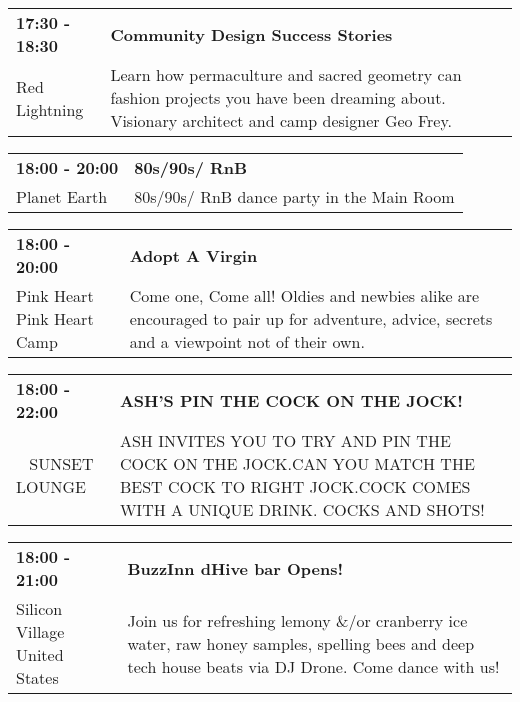\begin{tabular}{ p{1in} p{2.2in} }
    \textbf{17:30 - 18:30} & \textbf{Community Design Success Stories} \\
    Red Lightning \newline  & Learn how permaculture and sacred geometry can fashion projects you have been dreaming about. Visionary architect and camp designer Geo Frey. \\
    \hline 
\end{tabular}
    
\begin{tabular}{ p{1in} p{2.2in} }
    \textbf{18:00 - 20:00} & \textbf{80s/90s/ RnB} \\
    Planet Earth \newline  & 80s/90s/ RnB dance party in the Main Room \\
    \hline 
\end{tabular}
    
\begin{tabular}{ p{1in} p{2.2in} }
    \textbf{18:00 - 20:00} & \textbf{Adopt A Virgin} \\
    Pink Heart \newline Pink Heart Camp & Come one, Come all!  Oldies and newbies alike are encouraged to pair up for adventure, advice, secrets and a viewpoint not of their own. \\
    \hline 
\end{tabular}
    
\begin{tabular}{ p{1in} p{2.2in} }
    \textbf{18:00 - 22:00} & \textbf{ASH'S PIN THE COCK ON THE JOCK!} \\
    ~ \newline SUNSET LOUNGE & ASH INVITES YOU TO TRY AND PIN THE COCK ON THE JOCK.CAN YOU MATCH THE BEST COCK TO RIGHT JOCK.COCK COMES WITH A UNIQUE DRINK. COCKS AND SHOTS! \\
    \hline 
\end{tabular}
    
\begin{tabular}{ p{1in} p{2.2in} }
    \textbf{18:00 - 21:00} & \textbf{BuzzInn dHive bar Opens!} \\
    Silicon Village \newline United States & Join us for refreshing lemony \&/or cranberry ice water, raw honey samples, spelling bees and deep tech house beats via DJ Drone.  Come dance with us! \\
    \hline 
\end{tabular}
    
